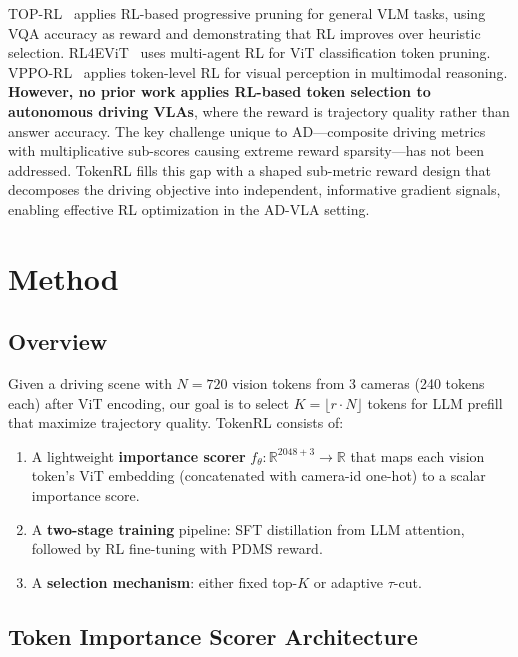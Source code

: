 \documentclass[letterpaper]{article} %
\newcommand{\ours}{TokenRL}
\begin{document}
TOP-RL~\citep{toprl2026} applies RL-based progressive pruning for general VLM tasks, using VQA accuracy as reward and demonstrating that RL improves over heuristic selection.
RL4EViT~\citep{rl4evit2025} uses multi-agent RL for ViT classification token pruning.
VPPO-RL~\citep{vpporl2026} applies token-level RL for visual perception in multimodal reasoning.
\textbf{However, no prior work applies RL-based token selection to autonomous driving VLAs}, where the reward is trajectory quality rather than answer accuracy.
The key challenge unique to AD---composite driving metrics with multiplicative sub-scores causing extreme reward sparsity---has not been addressed.
\ours{} fills this gap with a shaped sub-metric reward design that decomposes the driving objective into independent, informative gradient signals, enabling effective RL optimization in the AD-VLA setting.

\section{Method}
\label{sec:method}

\subsection{Overview}

Given a driving scene with $N{=}720$ vision tokens from 3 cameras (240 tokens each) after ViT encoding, our goal is to select $K{=}\lfloor r \cdot N \rfloor$ tokens for LLM prefill that maximize trajectory quality.
\ours{} consists of:
\begin{enumerate}[nosep,leftmargin=*]
\item A lightweight \textbf{importance scorer} $f_\theta: \mathbb{R}^{2048+3} \to \mathbb{R}$ that maps each vision token's ViT embedding (concatenated with camera-id one-hot) to a scalar importance score.
\item A \textbf{two-stage training} pipeline: SFT distillation from LLM attention, followed by RL fine-tuning with PDMS reward.
\item A \textbf{selection mechanism}: either fixed top-$K$ or adaptive $\tau$-cut.
\end{enumerate}

\subsection{Token Importance Scorer Architecture}
\end{document}
